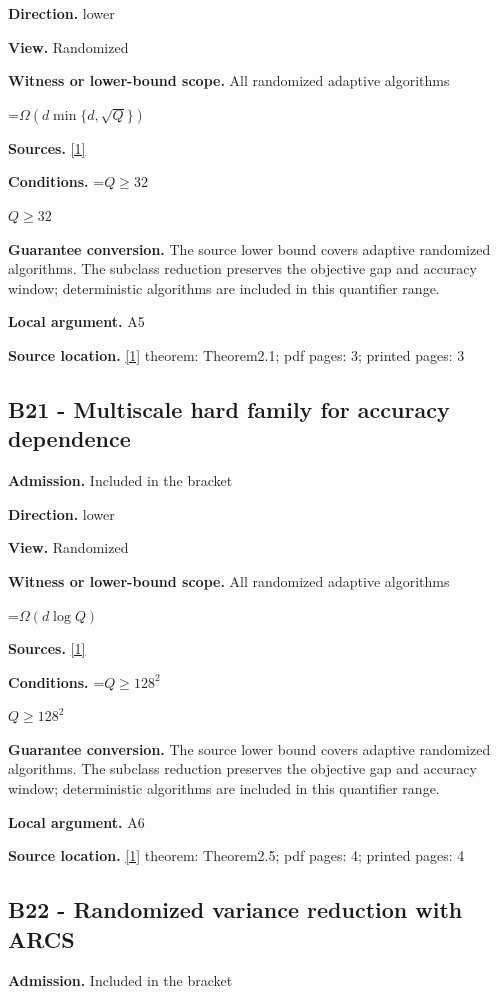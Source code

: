 \documentclass[10pt,a4paper]{article}
\newcommand{\AtlasMath}[1]{\par\begingroup\centering\setbox0=\hbox{$\displaystyle #1$}\ifdim\wd0>1.4\linewidth\typeout{ATLAS WIDE FORMULA: \the\wd0}\fi\ifdim\wd0>\linewidth\resizebox{\linewidth}{!}{\box0}\else\box0\fi\par\endgroup}
\newcommand{\AtlasInlineMath}[1]{\begingroup\setbox0=\hbox{$#1$}\ifdim\wd0>.4\linewidth\endgroup\AtlasMath{#1}\else\endgroup$#1$\fi}
\begin{document}
\textbf{Direction.} lower

\textbf{View.} Randomized

\textbf{Witness or lower-bound scope.} All randomized adaptive algorithms

\AtlasMath{\Omega(d\min\{d,\sqrt Q\})}
\textbf{Sources.} \href{https://arxiv.org/html/2610.00345v1}{[1]}

\textbf{Conditions.} \AtlasInlineMath{Q\ge32}

\textbf{Guarantee conversion.} The source lower bound covers adaptive randomized algorithms. The subclass reduction preserves the objective gap and accuracy window; deterministic algorithms are included in this quantifier range.

\textbf{Local argument.} A5

\textbf{Source location.} \href{https://arxiv.org/html/2610.00345v1}{[1]} theorem: Theorem2.1; pdf pages: 3; printed pages: 3

\subsection{B21 - Multiscale hard family for accuracy dependence}
\textbf{Admission.} Included in the bracket

\textbf{Direction.} lower

\textbf{View.} Randomized

\textbf{Witness or lower-bound scope.} All randomized adaptive algorithms

\AtlasMath{\Omega(d\log Q)}
\textbf{Sources.} \href{https://arxiv.org/html/2610.00345v1}{[1]}

\textbf{Conditions.} \AtlasInlineMath{Q\ge128^2}

\textbf{Guarantee conversion.} The source lower bound covers adaptive randomized algorithms. The subclass reduction preserves the objective gap and accuracy window; deterministic algorithms are included in this quantifier range.

\textbf{Local argument.} A6

\textbf{Source location.} \href{https://arxiv.org/html/2610.00345v1}{[1]} theorem: Theorem2.5; pdf pages: 4; printed pages: 4

\subsection{B22 - Randomized variance reduction with ARCS}
\textbf{Admission.} Included in the bracket
\end{document}
